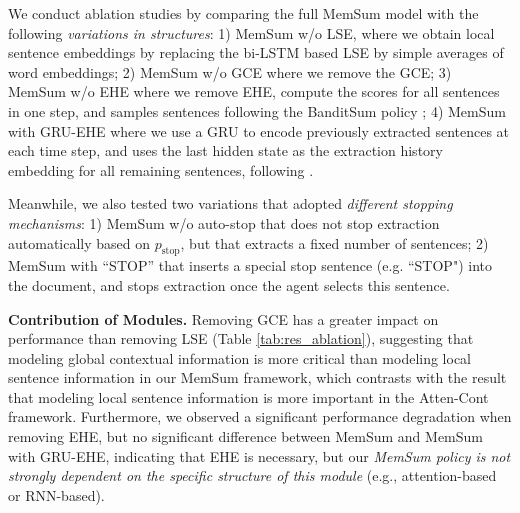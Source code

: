 \documentclass[11pt]{article}
\begin{document}
\begin{table}
\centering
{}
\caption{ \label{tab:res_ablation} Ablation study on the PubMed dataset. } 

\end{table}
We conduct ablation studies by comparing the full MemSum model with the following \textit{variations in structures}: 1) MemSum w/o LSE, where we obtain local sentence embeddings by replacing the bi-LSTM based LSE by simple averages of word embeddings; 2) MemSum w/o GCE where we remove the GCE; 3) MemSum w/o EHE where we remove EHE, compute the scores for all sentences in one step, and samples sentences following the BanditSum policy \cite{dong2018banditsum}; 4) MemSum with GRU-EHE where we use a GRU to encode previously extracted sentences at each time step, and uses the last hidden state as the extraction history embedding for all remaining sentences, following  \citet{zhou-etal-2018-neural-document}.  

Meanwhile, we also tested two variations that adopted \textit{different stopping mechanisms}:  1) MemSum w/o auto-stop that does not stop extraction automatically based on $p_\text{stop}$, but that extracts a fixed number of sentences; 2) MemSum with ``STOP'' that inserts a  special  stop sentence  (e.g.   “STOP")  into  the document, and stops extraction once the agent selects this sentence.


\noindent\textbf{Contribution of Modules.} 
Removing GCE has a greater impact on performance than removing LSE (Table \ref{tab:res_ablation}), suggesting that modeling global contextual information is more critical than modeling local sentence information in our MemSum framework, which contrasts with the result that modeling local sentence information is more important in the Atten-Cont \cite{xiao-carenini-2019-extractive} framework. Furthermore, we observed a significant performance degradation when removing EHE, but no significant difference between MemSum and MemSum with GRU-EHE, indicating that EHE is necessary, but our \textit{MemSum policy is not strongly dependent on the specific structure of this module} (e.g., attention-based or RNN-based). 
\end{document}
